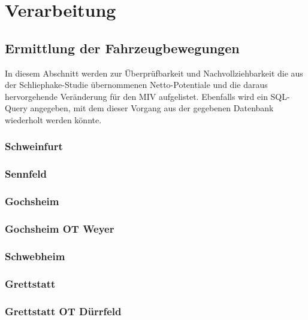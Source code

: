 \documentclass[fontsize=12pt,a4paper]{scrreprt}
\begin{document}
    \chapter{Verarbeitung}

        \section{Ermittlung der Fahrzeugbewegungen}
In diesem Abschnitt werden zur Überprüfbarkeit und Nachvollziehbarkeit die aus der Schliephake-Studie übernommenen Netto-Potentiale und die daraus hervorgehende Veränderung für den MIV aufgelistet. Ebenfalls wird ein SQL-Query angegeben, mit dem dieser Vorgang aus der gegebenen Datenbank wiederholt werden könnte.
            \subsection{Schweinfurt}
            
            
            \subsection{Sennfeld}
            

            \subsection{Gochsheim}
            

            \subsection{Gochsheim OT Weyer}
            

            \subsection{Schwebheim}
            

            \subsection{Grettstatt}
            

            \subsection{Grettstatt OT Dürrfeld}
            
\end{document}
